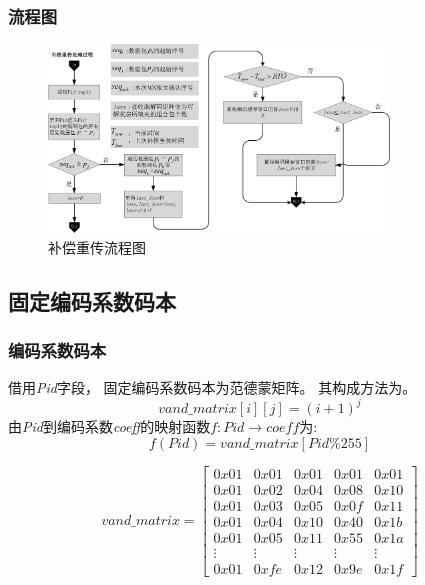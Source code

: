 \begin{frame}
	\frametitle{流程图}
	\begin{figure}
		\hspace{-1.5em}
		\includegraphics[height=5cm]{../figures/bccc.eps}
		\caption{补偿重传流程图}
		\label{fig:buchang}
	\end{figure}
\end{frame}

\subsection{固定编码系数码本}
\begin{frame}
	\frametitle{编码系数码本}
	借用\emph{Pid}字段，
	固定编码系数码本为范德蒙矩阵。
	其构成方法为。
	\begin{equation}\label{eq:vandmat}
	vand\_matrix[i][j]=(i+1)^j
	\end{equation}
	由\emph{Pid}到编码系数\emph{coeff}的映射函数$f:Pid \rightarrow coeff$为:
	\begin{equation}\label{eq:vandyingshe}
	f(Pid)=vand\_matrix[Pid\%255]
	\end{equation}
	
	\begin{tiny}
			\begin{equation}
		vand\_matrix=\left[ {\begin{array}{*{20}{c}}
			{0x01}&{0x01}&{0x01}&{0x01}&{0x01}\\
			{0x01}&{0x02}&{0x04}&{0x08}&{0x10}\\
			{0x01}&{0x03}&{0x05}&{0x0f}&{0x11}\\
			{0x01}&{0x04}&{0x10}&{0x40}&{0x1b}\\
			{0x01}&{0x05}&{0x11}&{0x55}&{0x1a}\\
			{\vdots}&{\vdots}&{\vdots}&{\vdots}&{\vdots}\\
			{0x01}&{0xfe}&{0x12}&{0x9e}&{0x1f}
			\end{array}} \right]
		\end{equation}
	\end{tiny}

\end{frame}

